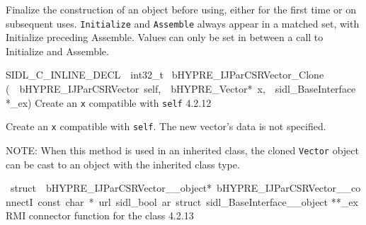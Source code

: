 \documentclass{article}
\begin{document}
\begin{cxxentry}
\begin{cxxentry}
\begin{cxxfunction}
\begin{cxxdoc}
Finalize the construction of an object before using, either
for the first time or on subsequent uses. {\tt Initialize}
and {\tt Assemble} always appear in a matched set, with
Initialize preceding Assemble. Values can only be set in
between a call to Initialize and Assemble.
\end{cxxdoc}
\end{cxxfunction}
\begin{cxxfunction}
{SIDL\_C\_INLINE\_DECL\ \ int32\_t\ }
        {bHYPRE\_IJParCSRVector\_Clone}
        {(\ \ bHYPRE\_IJParCSRVector\ self,\ \ bHYPRE\_Vector*\ x,\ \ sidl\_BaseInterface\ *\_ex)}
        {
Create an {\tt x} compatible with {\tt self}}
        {4.2.12}
\begin{cxxdoc}

Create an {\tt x} compatible with {\tt self}.
The new vector's data is not specified.

NOTE: When this method is used in an inherited class, the
cloned {\tt Vector} object can be cast to an object with the
inherited class type.
\end{cxxdoc}
\end{cxxfunction}
\begin{cxxvariable}
{\ struct\ \ bHYPRE\_IJParCSRVector\_\_object*\ bHYPRE\_IJParCSRVector\_\_connectI\ const\ char\ *\ url\ sidl\_bool\ ar\ struct\ sidl\_BaseInterface\_\_object}
        {**\_ex}
        {}
        {
RMI connector function for the class}
        {4.2.13}
\begin{cxxdoc}


\end{cxxdoc}
\end{cxxvariable}
\end{cxxentry}
\end{cxxentry}
\end{document}
